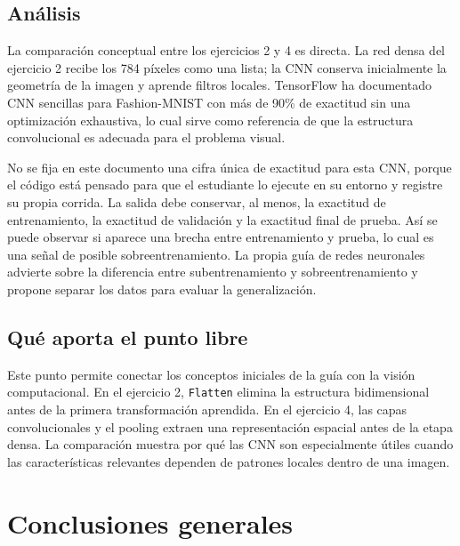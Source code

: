 \documentclass[14pt,twoside]{article}
\begin{document}
\subsection{Análisis}

La comparación conceptual entre los ejercicios 2 y 4 es directa. La red densa del ejercicio 2 recibe los 784 píxeles como una lista; la CNN conserva inicialmente la geometría de la imagen y aprende filtros locales. TensorFlow ha documentado CNN sencillas para Fashion-MNIST con más de 90\% de exactitud sin una optimización exhaustiva, lo cual sirve como referencia de que la estructura convolucional es adecuada para el problema visual. \cite{tensorflowcnnblog}

No se fija en este documento una cifra única de exactitud para esta CNN, porque el código está pensado para que el estudiante lo ejecute en su entorno y registre su propia corrida. La salida debe conservar, al menos, la exactitud de entrenamiento, la exactitud de validación y la exactitud final de prueba. Así se puede observar si aparece una brecha entre entrenamiento y prueba, lo cual es una señal de posible sobreentrenamiento. La propia guía de redes neuronales advierte sobre la diferencia entre subentrenamiento y sobreentrenamiento y propone separar los datos para evaluar la generalización. \cite{martinez2026}

\subsection{Qué aporta el punto libre}

Este punto permite conectar los conceptos iniciales de la guía con la visión computacional. En el ejercicio 2, \texttt{Flatten} elimina la estructura bidimensional antes de la primera transformación aprendida. En el ejercicio 4, las capas convolucionales y el pooling extraen una representación espacial antes de la etapa densa. La comparación muestra por qué las CNN son especialmente útiles cuando las características relevantes dependen de patrones locales dentro de una imagen. \cite{martinez2026,tensorflowcnnblog}

\section{Conclusiones generales}
\end{document}
